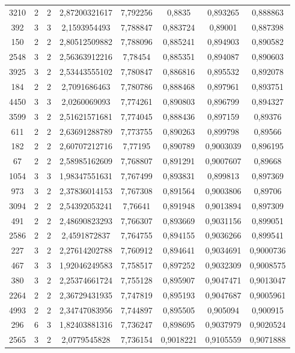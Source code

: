 \begin{longtable}{|c|c|c|c|c|c|c|c|}
3210 & 2 & 2 & 2,87200321617 & 7,792256 & 0,8835 & 0,893265 & 0,888863 \\
392 & 3 & 3 & 2,1593954493 & 7,788847 & 0,883724 & 0,89001 & 0,887398 \\
150 & 2 & 2 & 2,80512509882 & 7,788096 & 0,885241 & 0,894903 & 0,890582 \\
2548 & 3 & 2 & 2,56363912216 & 7,78454 & 0,885351 & 0,894087 & 0,890603 \\
3925 & 3 & 2 & 2,53443555102 & 7,780847 & 0,886816 & 0,895532 & 0,892078 \\
184 & 2 & 2 & 2,7091686463 & 7,780786 & 0,888468 & 0,897961 & 0,893751 \\
4450 & 3 & 3 & 2,0260069093 & 7,774261 & 0,890803 & 0,896799 & 0,894327 \\
3599 & 3 & 2 & 2,51621571681 & 7,774045 & 0,888436 & 0,897159 & 0,89376 \\
611 & 2 & 2 & 2,63691288789 & 7,773755 & 0,890263 & 0,899798 & 0,89566 \\
182 & 2 & 2 & 2,60707212716 & 7,77195 & 0,890789 & 0,9003039 & 0,896195 \\
67 & 2 & 2 & 2,58985162609 & 7,768807 & 0,891291 & 0,9007607 & 0,89668 \\
1054 & 3 & 3 & 1,98347551631 & 7,767499 & 0,893831 & 0,899813 & 0,897369 \\
973 & 3 & 2 & 2,37836014153 & 7,767308 & 0,891564 & 0,9003806 & 0,89706 \\
3094 & 2 & 2 & 2,54392053241 & 7,76641 & 0,891948 & 0,9013894 & 0,897309 \\
491 & 2 & 2 & 2,48690823293 & 7,766307 & 0,893669 & 0,9031156 & 0,899051 \\
2586 & 2 & 2 & 2,4591872837 & 7,764755 & 0,894155 & 0,9036266 & 0,899541 \\
227 & 3 & 2 & 2,27614202788 & 7,760912 & 0,894641 & 0,9034691 & 0,9000736 \\
467 & 3 & 3 & 1,92046249583 & 7,758517 & 0,897252 & 0,9032309 & 0,9008575 \\
380 & 3 & 2 & 2,25374661724 & 7,755128 & 0,895907 & 0,9047471 & 0,9013047 \\
2264 & 2 & 2 & 2,36729431935 & 7,747819 & 0,895193 & 0,9047687 & 0,9005961 \\
4993 & 2 & 2 & 2,34747083956 & 7,744897 & 0,895505 & 0,905094 & 0,900915 \\
296 & 6 & 3 & 1,82403881316 & 7,736247 & 0,898695 & 0,9037979 & 0,9020524 \\
2565 & 3 & 2 & 2,0779545828 & 7,736154 & 0,9018221 & 0,9105559 & 0,9071888 \\

\end{longtable}

